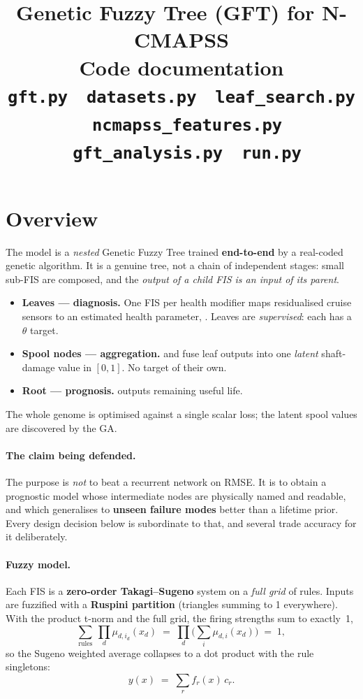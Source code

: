 \documentclass[11pt,a4paper]{article}
\title{\textbf{Genetic Fuzzy Tree (GFT) for N-CMAPSS}\\[2pt]
\large Code documentation\\[4pt]
\normalsize \texttt{gft.py} \textperiodcentered\ \texttt{datasets.py} \textperiodcentered\
\texttt{leaf\_search.py} \textperiodcentered\ \texttt{ncmapss\_features.py} \textperiodcentered\
\texttt{gft\_analysis.py} \textperiodcentered\ \texttt{run.py}}
\author{}
\date{}
\newcommand{\code}[1]{\texttt{\detokenize{#1}}}
\begin{document}
\maketitle
\vspace{-2.4em}

\section{Overview}

The model is a \emph{nested} Genetic Fuzzy Tree trained \textbf{end-to-end} by a
real-coded genetic algorithm. It is a genuine tree, not a chain of independent
stages: small sub-FIS are composed, and the \emph{output of a child FIS is an input
of its parent}.

\begin{itemize}[leftmargin=1.4em,itemsep=1pt]
\item \textbf{Leaves --- diagnosis.} One FIS per health modifier maps residualised
      cruise sensors to an estimated health parameter, \code{[sensors] -> theta_hat}.
      Leaves are \emph{supervised}: each has a $\theta$ target.
\item \textbf{Spool nodes --- aggregation.} \code{hp} and \code{lp} fuse leaf outputs
      into one \emph{latent} shaft-damage value in $[0,1]$. No target of their own.
\item \textbf{Root --- prognosis.} \code{RUL(hp, lp)} outputs remaining useful life.
\end{itemize}

\noindent The whole genome is optimised against a single scalar loss; the latent
spool values are discovered by the GA.

\paragraph{The claim being defended.} The purpose is \emph{not} to beat a recurrent
network on RMSE. It is to obtain a prognostic model whose intermediate nodes are
physically named and readable, and which generalises to \textbf{unseen failure modes}
better than a lifetime prior. Every design decision below is subordinate to that, and
several trade accuracy for it deliberately.

\paragraph{Fuzzy model.} Each FIS is a \textbf{zero-order Takagi--Sugeno} system on a
\emph{full grid} of rules. Inputs are fuzzified with a \textbf{Ruspini partition}
(triangles summing to 1 everywhere). With the product t-norm and the full grid, the
firing strengths sum to exactly~1,
\[
  \sum_{\text{rules}}\ \prod_d \mu_{d,i_d}(x_d)
  \;=\; \prod_d \Big(\sum_i \mu_{d,i}(x_d)\Big) \;=\; 1 ,
\]
so the Sugeno weighted average collapses to a dot product with the rule singletons:
\[
  y(x)\;=\;\sum_r f_r(x)\, c_r .
\]
\end{document}
